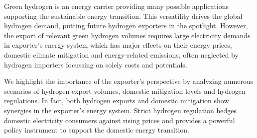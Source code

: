 
Green hydrogen is an energy carrier providing many possible applications supporting the sustainable energy transition. 
This versatility drives the global hydrogen demand, putting future hydrogen exporters in the spotlight. 
However, the export of relevant green hydrogen volumes requires large electricity demands in exporter's energy system which has major effects on their energy prices, domestic climate mitigation and energy-related emissions, often neglected by hydrogen importers focussing on solely costs and potentials.

We highlight the importance of the exporter's perspective by analyzing numerous scenarios of hydrogen export volumes, domestic mitigation levels and hydrogen regulations. In fact, both hydrogen exports and domestic mitigation show synergies in the exporter's energy system. Strict hydrogen regulation hedges domestic electricity consumers against rising prices and provides a powerful policy instrument to support the domestic energy transition.
